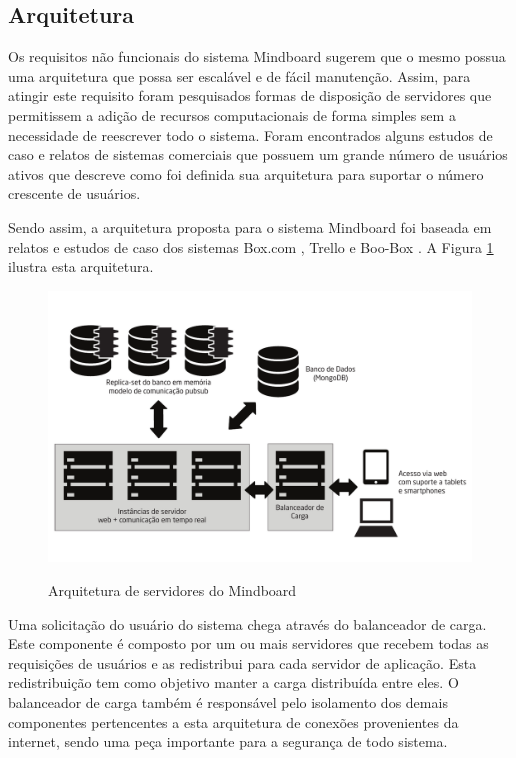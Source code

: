 \subsection{Arquitetura}
\label{sec:arquitetura}

Os requisitos não funcionais do sistema Mindboard sugerem que o mesmo possua uma arquitetura que possa ser escalável e de fácil manutenção. Assim, para atingir este requisito foram pesquisados formas de disposição de servidores que permitissem a adição de recursos computacionais de forma simples sem a necessidade de reescrever todo o sistema. Foram encontrados alguns estudos de caso e relatos de sistemas comerciais que possuem um grande número de usuários ativos que descreve como foi definida sua arquitetura para suportar o número crescente de usuários. 

Sendo assim, a arquitetura proposta para o sistema Mindboard foi baseada em relatos e estudos de caso dos sistemas Box.com \cite{boxcom}, Trello \cite{trello} e Boo-Box \cite{boobox}. A Figura \ref{fig:arquitetura} ilustra esta arquitetura.

\begin{figure}[!h]
\centering
\caption{Arquitetura de servidores do Mindboard}
\includegraphics[width=1.0\textwidth]{pdfs/img-arquitetura-lb.pdf} 
\label{fig:arquitetura} 
\end{figure}

Uma solicitação do usuário do sistema chega através do balanceador de carga. Este componente é composto por um ou mais servidores que recebem todas as requisições de usuários e as redistribui para cada servidor de aplicação. Esta redistribuição tem como objetivo manter a carga distribuída entre eles. O balanceador de carga também é responsável pelo isolamento dos demais componentes pertencentes a esta arquitetura de conexões provenientes da internet, sendo uma peça importante para a segurança de todo sistema. 

